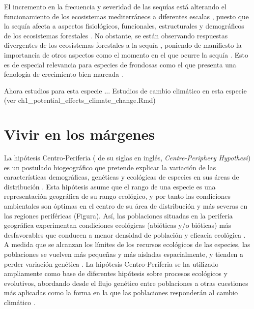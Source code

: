 El incremento en la frecuencia y severidad de las sequías está alterando el funcionamiento de los ecosistemas mediterráneos a diferentes escalas \autocites{Penuelasetal2017ImpactsGlobal,Forneretal2018ExtremeDroughts,Liuetal2020EffectsDecadal,OgayaPenuelas2021ClimateChange}, puesto que la sequía afecta a aspectos fisiológicos, funcionales, estructurales y demográficos de los ecosistemas forestales \autocites{Allenetal2010GlobalOverview, Assaletal2016SpatialTemporal}. No obstante, se están observando respuestas divergentes de los ecosistemas forestales a la sequía \autocites{Andereggetal2020DivergentForest}, poniendo de manifiesto la importancia de otros aspectos como el momento en el que ocurre la sequía \autocites{Huangetal2018DroughtTiming}. Esto es de especial relevancia para especies de frondosas como el \Qpy que presenta una fenología de crecimiento bien marcada \autocites{PerezdeLisetal2016ChangesSpring}. 


Ahora estudios para esta especie ... 
Estudios de cambio climático en esta especie (ver ch1_potential_effects_climate_change.Rmd)



\section{Vivir en los márgenes}\label{sec:intro:rear-edge}

La hipótesis Centro-Periferia ( de su siglas en inglés, \textit{Centre-Periphery Hypothesi}) es un postulado biogeográfico que pretende explicar la variación de las características demográficas, genéticas y ecológicas de especies en sus áreas de distribución \autocite{Sextonetal2009EvolutionEcology, Pirononetal2015GeographicClimatic}. Esta hipótesis asume que el rango de una especie es una representación geográfica de su rango ecológico, y por tanto las condiciones ambientales son óptimas en el centro de su área de distribución y más severas en las regiones periféricas \autocite{Pirononetal2017GeographicVariation}(Figura). Así, las poblaciones situadas en la periferia geográfica experimentan condiciones ecológicas (abióticas y/o bióticas) más desfavorables que conducen a menor densidad de población y eficacia ecológica \autocite[\textit{fitness},][]{Brown1984RelationshipAbundance}. A medida que se alcanzan los límites de los recursos ecológicos de las especies, las poblaciones se vuelven más pequeñas y más aisladas espacialmente, y tienden a perder variación genética \autocites[][]{Karketal2008HowDoes,Garciaetal2010LivingEdge}. La hipótesis Centro-Periferia se ha utilizado ampliamente como base de diferentes hipótesis sobre procesos ecológicos y evolutivos, abordando desde el flujo genético entre poblaciones a otras cuestiones más aplicadas como la forma en la que las poblaciones responderán al cambio climático \autocites{SagarinGaines2002AbundantCentre}. 


